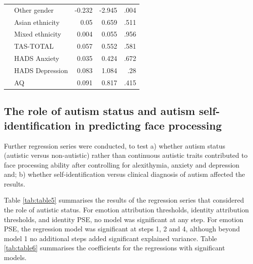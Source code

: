 \documentclass[
]{article}
\begin{document}
\begin{table}[H]
\begin{tabular}[t]{llrrr}
\addlinespace
 & Other gender & -0.232 & -2.945 & .004\\
 & Asian ethnicity & 0.05 & 0.659 & .511\\
 & Mixed ethnicity & 0.004 & 0.055 & .956\\
 & TAS-TOTAL & 0.057 & 0.552 & .581\\
 & HADS Anxiety & 0.035 & 0.424 & .672\\
\addlinespace
 & HADS Depression & 0.083 & 1.084 & .28\\
 & AQ & 0.091 & 0.817 & .415\\
\bottomrule
\end{tabular}
\end{table}

\hypertarget{the-role-of-autism-status-and-autism-self-identification-in-predicting-face-processing}{%
\subsection*{The role of autism status and autism self-identification in predicting face processing}\label{the-role-of-autism-status-and-autism-self-identification-in-predicting-face-processing}}

Further regression series were conducted, to test a) whether autism status (autistic versus non-autistic) rather than continuous autistic traits contributed to face processing ability after controlling for alexithymia, anxiety and depression and; b) whether self-identification versus clinical diagnosis of autism affected the results.

Table \ref{tab:table5} summarises the results of the regression series that considered the role of autistic status. For emotion attribution thresholds, identity attribution thresholds, and identity PSE, no model was significant at any step. For emotion PSE, the regression model was significant at steps 1, 2 and 4, although beyond model 1 no additional steps added significant explained variance. Table \ref{tab:table6} summarises the coefficients for the regressions with significant models.
\end{document}

